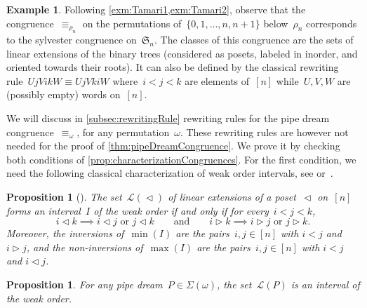 \documentclass[reqno]{amsart}
\newtheorem{proposition}[theorem]{Proposition}
\theoremstyle{definition}
\newtheorem{example}[theorem]{Example}
\newcommand{\fS}{\mathfrak{S}} %
\newcommand{\acyclicPipeDreams}{\Sigma} %
\newcommand{\linearExtensions}{\mathcal{L}} %
\newcommand{\less}{\vartriangleleft} %
\newcommand{\more}{\vartriangleright} %
\begin{document}
\begin{example}
\label{exm:Tamari3}
Following \cref{exm:Tamari1,exm:Tamari2}, observe that the congruence~$\equiv_{\rho_n}$ on the permutations of~$\{0, 1, \dots, n, n+1\}$ below~$\rho_n$ corresponds to the sylvester congruence on~$\fS_n$.
The classes of this congruence are the sets of linear extensions of the binary trees (considered as posets, labeled in inorder, and oriented towards their roots).
It can also be defined by the classical rewriting rule~$UjVikW \equiv UjVkiW$ where~$i < j < k$ are elements of~$[n]$ while~$U, V, W$ are (possibly empty) words on~$[n]$.
\end{example}

We will discuss in \cref{subsec:rewritingRule} rewriting rules for the pipe dream congruence~$\equiv_\omega$, for any permutation~$\omega$.
These rewriting rules are however not needed for the proof of \cref{thm:pipeDreamCongruence}.
We prove it by checking both conditions of \cref{prop:characterizationCongruences}.
For the first condition, we need the following classical characterization of weak order intervals, see \cite{BjornerWachs} or~\cite{ChatelPilaudPons}.

\begin{proposition}[{\cite[Thm.~6.8]{BjornerWachs}}]
\label{prop:WOIP}
The set~$\linearExtensions(\less)$ of linear extensions of a poset~$\less$ on~$[n]$ forms an interval~$I$ of the weak order if and only if for every~$i < j < k$,
\[
i \less k \implies i \less j \text{ or } j \less k
\qquad\text{and}\qquad
i \more k \implies i \more j \text{ or } j \more k.
\]
Moreover, the inversions of~$\min(I)$ are the pairs~$i,j \in [n]$ with $i < j$ and $i \more j$, and the non-inversions of~$\max(I)$ are the pairs~$i,j \in [n]$ with $i < j$ and $i \less j$.
\end{proposition}

\begin{proposition}
\label{prop:intervals}
For any pipe dream~$P \in \acyclicPipeDreams(\omega)$, the set~$\linearExtensions(P)$ is an interval of the weak order.
\end{proposition}
\end{document}
